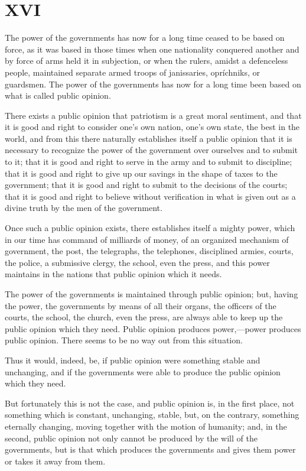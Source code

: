 \documentclass{book}
\begin{document}
\chapter{XVI}
\label{chapter-16}
The power of the governments has now for a long time ceased to be based on force, as it was based in those times when one nationality conquered another and by force of arms held it in subjection, or when the rulers, amidst a defenceless people, maintained separate armed troops of janissaries, opríchniks, or guardsmen. The power of the governments has now for a long time been based on what is called public opinion.

There exists a public opinion that patriotism is a great moral sentiment, and that it is good and right to consider one’s own nation, one’s own state, the best in the world, and from this there naturally establishes itself a public opinion that it is necessary to recognize the power of the government over ourselves and to submit to it; that it is good and right to serve in the army and to submit to discipline; that it is good and right to give up our savings in the shape of taxes to the government; that it is good and right to submit to the decisions of the courts; that it is good and right to believe without verification in what is given out as a divine truth by the men of the government.

Once such a public opinion exists, there establishes itself a mighty power, which in our time has command of milliards of money, of an organized mechanism of government, the post, the telegraphs, the telephones, disciplined armies, courts, the police, a submissive clergy, the school, even the press, and this power maintains in the nations that public opinion which it needs.

The power of the governments is maintained through public opinion; but, having the power, the governments by means of all their organs, the officers of the courts, the school, the church, even the press, are always able to keep up the public opinion which they need. Public opinion produces power,—power produces public opinion. There seems to be no way out from this situation.

Thus it would, indeed, be, if public opinion were something stable and unchanging, and if the governments were able to produce the public opinion which they need.

But fortunately this is not the case, and public opinion is, in the first place, not something which is constant, unchanging, stable, but, on the contrary, something eternally changing, moving together with the motion of humanity; and, in the second, public opinion not only cannot be produced by the will of the governments, but is that which produces the governments and gives them power or takes it away from them.
\end{document}
